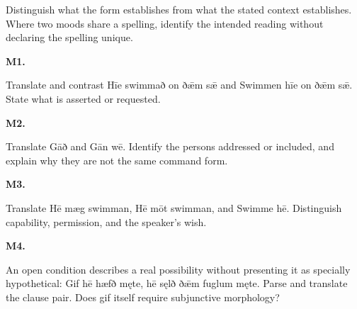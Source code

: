 Distinguish what the form establishes from what the stated context establishes. Where two moods share a spelling, identify the intended reading without declaring the spelling unique.

\par\begin{minipage}{\linewidth}\raggedright
\textbf{M1.}

Translate and contrast Hīe swimmað on ðǣm sǣ and Swimmen hīe on ðǣm sǣ. State what is asserted or requested.

\end{minipage}\par\addvspace{4pt}

\par\begin{minipage}{\linewidth}\raggedright
\textbf{M2.}

Translate Gāð and Gān wē. Identify the persons addressed or included, and explain why they are not the same command form.

\end{minipage}\par\addvspace{4pt}

\par\begin{minipage}{\linewidth}\raggedright
\textbf{M3.}

Translate Hē mæg swimman, Hē mōt swimman, and Swimme hē. Distinguish capability, permission, and the speaker’s wish.

\end{minipage}\par\addvspace{4pt}

\par\begin{minipage}{\linewidth}\raggedright
\textbf{M4.}

An open condition describes a real possibility without presenting it as specially hypothetical: Gif hē hæfð męte, hē sęlð ðǣm fuglum męte. Parse and translate the clause pair. Does gif itself require subjunctive morphology?

\end{minipage}\par\addvspace{4pt}


